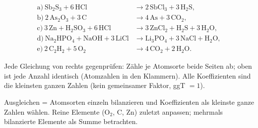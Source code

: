 \begin{ergebnis}
\begin{align*}
  \mathrm{a)\ Sb_2S_3 + 6\,HCl} &\to \mathrm{2\,SbCl_3 + 3\,H_2S},\\
  \mathrm{b)\ 2\,As_2O_3 + 3\,C} &\to \mathrm{4\,As + 3\,CO_2},\\
  \mathrm{c)\ 3\,Zn + H_2SO_3 + 6\,HCl} &\to \mathrm{3\,ZnCl_2 + H_2S + 3\,H_2O},\\
  \mathrm{d)\ Na_2HPO_4 + NaOH + 3\,LiCl} &\to \mathrm{Li_3PO_4 + 3\,NaCl + H_2O},\\
  \mathrm{e)\ 2\,C_2H_2 + 5\,O_2} &\to \mathrm{4\,CO_2 + 2\,H_2O}.
\end{align*}
\end{ergebnis}

\begin{kontrolle}
Jede Gleichung von rechts gegenprüfen: Zähle je Atomsorte beide Seiten
ab; oben ist jede Anzahl identisch (Atomzahlen in den Klammern). Alle
Koeffizienten sind die kleinsten ganzen Zahlen (kein gemeinsamer
Faktor, ggT $=1$).
\end{kontrolle}

\begin{merksatz}
Ausgleichen = Atomsorten einzeln bilanzieren und Koeffizienten als kleinste
ganze Zahlen wählen. Reine Elemente ($\mathrm{O_2}$, $\mathrm{C}$,
$\mathrm{Zn}$) zuletzt anpassen; mehrmals bilanzierte Elemente als Summe
betrachten.
\end{merksatz}
